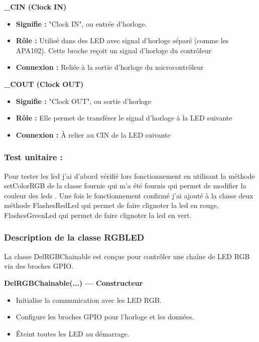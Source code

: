 \documentclass[main.tex]{subfiles}
\begin{document}
\textbf{\_CIN (Clock IN)}

\begin{itemize}
\item \textbf{Signifie :} "Clock IN", ou entrée d'horloge.
\item \textbf{Rôle :} Utilisé dans des LED avec signal d'horloge séparé (comme les APA102). Cette broche reçoit un signal d'horloge du contrôleur
\item \textbf{Connexion :} Reliée à la sortie d’horloge du microcontrôleur
\end{itemize} 

\textbf{\_COUT (Clock OUT)}

\begin{itemize}
\item \textbf{Signifie :} "Clock OUT", ou sortie d'horloge
\item \textbf{Rôle :} Elle permet de transférer le signal d’horloge à la LED suivante
\item \textbf{Connexion :} À relier au CIN de la LED suivante
\end{itemize}

\subsubsection{Test unitaire :}

Pour tester les led j’ai d’abord vérifié lors fonctionnement en utilisant la méthode setColorRGB de la classe fournie qui m’a été fournis qui permet de modifier la couleur des leds . Une fois le fonctionnement confirmé j’ai ajouté à la classe deux méthode FlashesRedLed qui permet de faire clignoter la led en rouge, FlashesGreenLed qui permet de faire clignoter la led en vert.

\subsubsection{Description de la classe RGBLED}

La classe DelRGBChainable est conçue pour contrôler une chaîne de LED RGB via des broches GPIO.
 
\textbf{DelRGBChainable(...) — Constructeur}

\begin{itemize}
\item Initialise la communication avec les LED RGB.
\item Configure les broches GPIO pour l’horloge et les données.
\item Éteint toutes les LED au démarrage.
\end{itemize}
\end{document}
